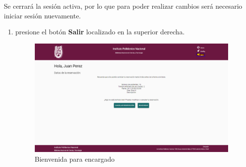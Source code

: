 Se cerrará la sesión activa, por lo que para poder realizar
cambios será necesario iniciar sesión nuevamente.
\begin{enumerate}
	\item presione el botón \textbf{Salir} localizado
		en la superior derecha.
		
		\begin{figure}[hbtp]
		
		\includegraphics[scale=0.3]{images/Interfaz/IUGS10_logoutSolicitante.png}
		\caption{Bienvenida para encargado}
	\end{figure}
	
\end{enumerate}


	